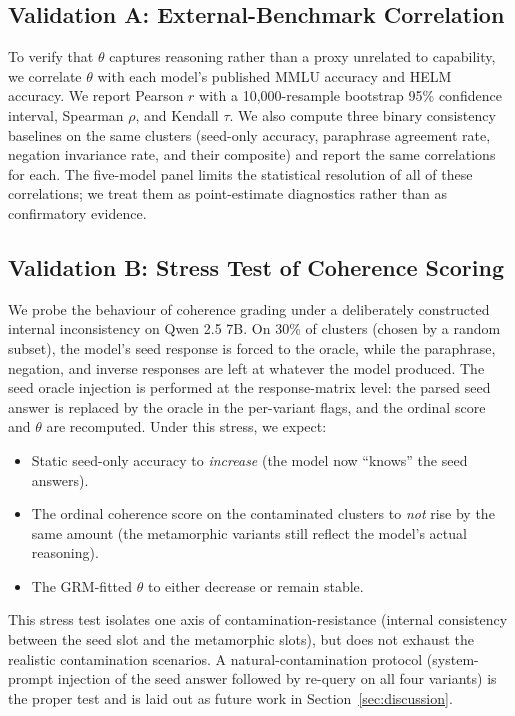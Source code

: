 \documentclass[11pt,letterpaper]{article}
\begin{document}
\subsection{Validation A: External-Benchmark Correlation}
\label{sec:val-a}

To verify that $\theta$ captures reasoning rather than a proxy unrelated to capability, we correlate $\theta$ with each model's published MMLU accuracy and HELM accuracy. We report Pearson $r$ with a 10{,}000-resample bootstrap 95\% confidence interval, Spearman $\rho$, and Kendall $\tau$. We also compute three binary consistency baselines on the same clusters (seed-only accuracy, paraphrase agreement rate, negation invariance rate, and their composite) and report the same correlations for each. The five-model panel limits the statistical resolution of all of these correlations; we treat them as point-estimate diagnostics rather than as confirmatory evidence.

\subsection{Validation B: Stress Test of Coherence Scoring}
\label{sec:stress}

We probe the behaviour of coherence grading under a deliberately constructed internal inconsistency on Qwen 2.5 7B. On 30\% of clusters (chosen by a random subset), the model's seed response is forced to the oracle, while the paraphrase, negation, and inverse responses are left at whatever the model produced. The seed oracle injection is performed at the response-matrix level: the parsed seed answer is replaced by the oracle in the per-variant flags, and the ordinal score and $\theta$ are recomputed. Under this stress, we expect:
\begin{itemize}
  \item Static seed-only accuracy to \emph{increase} (the model now ``knows'' the seed answers).
  \item The ordinal coherence score on the contaminated clusters to \emph{not} rise by the same amount (the metamorphic variants still reflect the model's actual reasoning).
  \item The GRM-fitted $\theta$ to either decrease or remain stable.
\end{itemize}

This stress test isolates one axis of contamination-resistance (internal consistency between the seed slot and the metamorphic slots), but does not exhaust the realistic contamination scenarios. A natural-contamination protocol (system-prompt injection of the seed answer followed by re-query on all four variants) is the proper test and is laid out as future work in Section~\ref{sec:discussion}.
\end{document}
